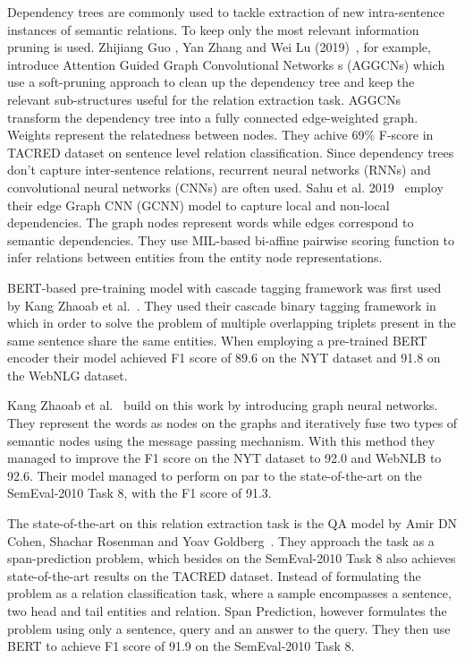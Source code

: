 \documentclass[fleqn,moreauthors,10pt]{ds_report}
\begin{document}
Dependency trees are commonly used to tackle extraction of new intra-sentence instances of semantic relations. To keep only the most relevant information pruning is used. Zhijiang Guo , Yan Zhang and Wei Lu (2019)~\cite{zhijiang_nodate}, for example, introduce Attention Guided Graph Convolutional Networks s (AGGCNs) which use a soft-pruning approach to clean up the dependency tree and keep the relevant sub-structures useful for the relation extraction task. AGGCNs transform the dependency tree into a fully connected edge-weighted graph. Weights represent the relatedness between nodes. They achive 69\% F-score in TACRED dataset on sentence level relation classification. Since dependency trees don’t capture inter-sentence relations, recurrent neural networks (RNNs) and convolutional neural networks (CNNs) are often used. Sahu et al. 2019~\cite{sunil_kumar_nodate} employ their edge Graph CNN (GCNN) model to capture local and non-local dependencies. The graph nodes represent words while edges correspond to semantic dependencies. They use MIL-based bi-affine pairwise scoring function to infer relations between entities from the entity node representations. 

BERT-based pre-training model with cascade tagging framework was first used by Kang Zhaoab et al.~\cite{wei2019novel}. They used their cascade binary tagging framework in which in order to solve the problem of multiple overlapping triplets present in the same sentence share the same entities.  When employing a pre-trained BERT encoder their model achieved F1 score of  89.6 on the NYT dataset and 91.8 on the WebNLG dataset. 

Kang Zhaoab et al.~\cite{ZHAO2021106888} build on this work by introducing graph neural networks. They represent the words as nodes on the graphs and iteratively fuse two types of semantic nodes using the message passing mechanism. With this method they managed to improve the F1 score on the NYT dataset to 92.0 and WebNLB to 92.6. Their model managed to perform on par to the state-of-the-art on the SemEval-2010 Task 8, with the F1 score of 91.3. 

The state-of-the-art on this relation extraction task is the QA model by Amir DN Cohen, Shachar Rosenman and Yoav Goldberg~\cite{cohen2020relation}. They approach the task as a span-prediction problem, which besides on the SemEval-2010 Task 8 also achieves state-of-the-art results on the TACRED dataset. Instead of formulating the problem as a relation classification task, where a sample encompasses a sentence, two head and tail entities and relation. Span Prediction, however formulates the problem using only a sentence, query and an answer to the query. They then use BERT to achieve F1 score of 91.9 on the SemEval-2010 Task 8.
\end{document}

